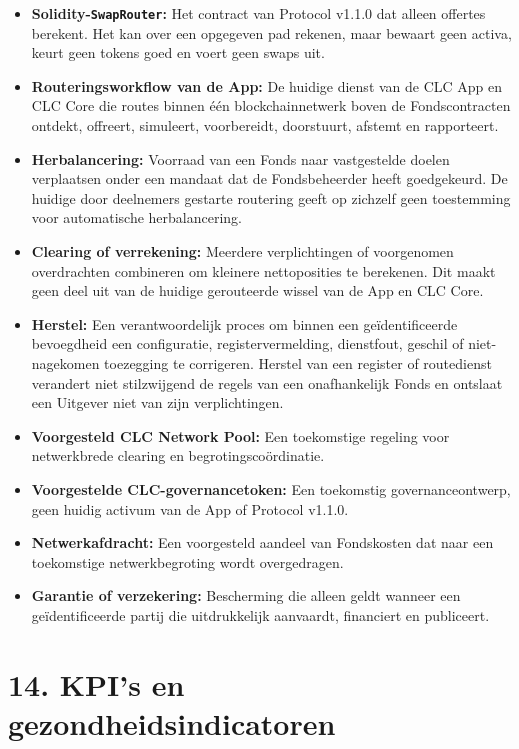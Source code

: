\documentclass[11pt]{article}
\begin{document}
\begin{itemize}[leftmargin=*]
\item \textbf{Solidity-\texttt{SwapRouter}:} Het contract van Protocol v1.1.0 dat alleen offertes berekent. Het kan over een opgegeven pad rekenen, maar bewaart geen activa, keurt geen tokens goed en voert geen swaps uit.
\item \textbf{Routeringsworkflow van de App:} De huidige dienst van de CLC App en CLC Core die routes binnen één blockchainnetwerk boven de Fondscontracten ontdekt, offreert, simuleert, voorbereidt, doorstuurt, afstemt en rapporteert.
\item \textbf{Herbalancering:} Voorraad van een Fonds naar vastgestelde doelen verplaatsen onder een mandaat dat de Fondsbeheerder heeft goedgekeurd. De huidige door deelnemers gestarte routering geeft op zichzelf geen toestemming voor automatische herbalancering.
\item \textbf{Clearing of verrekening:} Meerdere verplichtingen of voorgenomen overdrachten combineren om kleinere nettoposities te berekenen. Dit maakt geen deel uit van de huidige gerouteerde wissel van de App en CLC Core.
\item \textbf{Herstel:} Een verantwoordelijk proces om binnen een geïdentificeerde bevoegdheid een configuratie, registervermelding, dienstfout, geschil of niet-nagekomen toezegging te corrigeren. Herstel van een register of routedienst verandert niet stilzwijgend de regels van een onafhankelijk Fonds en ontslaat een Uitgever niet van zijn verplichtingen.
\item \textbf{Voorgesteld CLC Network Pool:} Een toekomstige regeling voor netwerkbrede clearing en begrotingscoördinatie.
\item \textbf{Voorgestelde CLC-governancetoken:} Een toekomstig governanceontwerp, geen huidig activum van de App of Protocol v1.1.0.
\item \textbf{Netwerkafdracht:} Een voorgesteld aandeel van Fondskosten dat naar een toekomstige netwerkbegroting wordt overgedragen.
\item \textbf{Garantie of verzekering:} Bescherming die alleen geldt wanneer een geïdentificeerde partij die uitdrukkelijk aanvaardt, financiert en publiceert.
\end{itemize}

\section*{14. KPI's en gezondheidsindicatoren}
\end{document}

